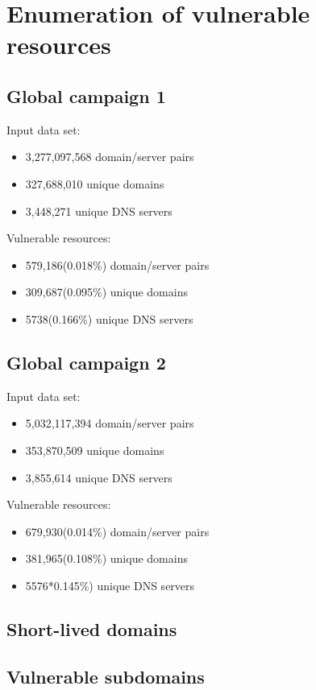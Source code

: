 \section{Enumeration of vulnerable resources}
\subsection{Global campaign 1}
Input data set: 
\begin{itemize}
 \item 3,277,097,568 domain/server pairs
 \item 327,688,010 unique domains
 \item 3,448,271 unique DNS servers
\end{itemize}

Vulnerable resources:
\begin{itemize}
 \item 579,186(0.018\%) domain/server pairs
 \item 309,687(0.095\%) unique domains
 \item 5738(0.166\%) unique DNS servers
\end{itemize}

\subsection{Global campaign 2}

Input data set: 
\begin{itemize}
 \item 5,032,117,394 domain/server pairs
 \item 353,870,509 unique domains
 \item 3,855,614 unique DNS servers
\end{itemize}

Vulnerable resources:
\begin{itemize}
 \item 679,930(0.014\%) domain/server pairs
 \item 381,965(0.108\%) unique domains
 \item 5576*0.145\%) unique DNS servers
\end{itemize}



\subsection{Short-lived domains}
\subsection{Vulnerable subdomains}
